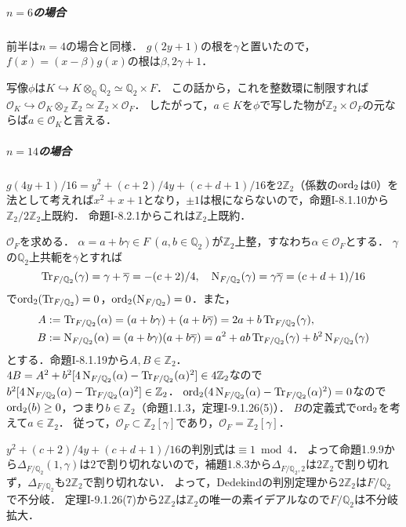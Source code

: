 \subparagraph{$n = 6$の場合}
前半は$n = 4$の場合と同様．
$g(2y+1)$の根を$\gamma$と置いたので，$f(x)=(x-\beta)g(x)$の根は$\beta, 2\gamma+1$．

写像$\phi$は$K\hookrightarrow K\otimes_\mathbb{Q}\mathbb{Q}_2\simeq\mathbb{Q}_2\times F$．
この話から，これを整数環に制限すれば$\mathcal{O}_K\hookrightarrow\mathcal{O}_K\otimes_\mathbb{Z}\mathbb{Z}_2\simeq\mathbb{Z}_2\times\mathcal{O}_F$．
したがって，$a\in K$を$\phi$で写した物が$\mathbb{Z}_2\times\mathcal{O}_F$の元ならば$a\in\mathcal{O}_K$と言える．

\subparagraph{$n = 14$の場合}
$g(4y+1)/16 = y^2+(c+2)/4y+(c+d+1)/16$を$2\mathbb{Z}_2$（係数の$\operatorname{ord}_2$は$0$）を法として考えれば$x^2+x+1$となり，$\pm1$は根にならないので，命題I-8.1.10から$\mathbb{Z}_2/2\mathbb{Z}_2$上既約．
命題I-8.2.1からこれは$\mathbb{Z}_2$上既約．

$\mathcal{O}_F$を求める．
$\alpha=a+b\gamma\in F~ (a, b\in\mathbb{Q}_2)$が$\mathbb{Z}_2$上整，すなわち$\alpha \in \mathcal{O}_F$とする．
$\gamma$の$\mathbb{Q}_2$上共軛を$\overline{\gamma}$とすれば
\[\operatorname{Tr}_{F/\mathbb{Q}_2}(\gamma)=\gamma+\overline{\gamma}=-(c+2)/4, \quad\operatorname{N}_{F/\mathbb{Q}_2}(\gamma)=\gamma\overline{\gamma}=(c+d+1)/16\]
で$\operatorname{ord}_2(\operatorname{Tr}_{F/\mathbb{Q}_2})=0$，$\operatorname{ord}_2(\operatorname{N}_{F/\mathbb{Q}_2})=0$．また，
\begin{align*}
  A &:= \operatorname{Tr}_{F/\mathbb{Q}_2}(\alpha) = (a+b\gamma) + (a+b\overline{\gamma}) = 2a + b\operatorname{Tr}_{F/\mathbb{Q}_2}(\gamma), \\
  B &:= \operatorname{N}_{F/\mathbb{Q}_2}(\alpha) = (a+b\gamma)(a+b\overline{\gamma}) = a^2 + ab\operatorname{Tr}_{F/\mathbb{Q}_2}(\gamma) + b^2\operatorname{N}_{F/\mathbb{Q}_2}(\gamma)
\end{align*}
とする．命題I-8.1.19から$A, B\in\mathbb{Z}_2$．
$4B=A^2+b^2[4\operatorname{N}_{F/\mathbb{Q}_2}(\alpha)-\operatorname{Tr}_{F/\mathbb{Q}_2}(\alpha)^2]\in4\mathbb{Z}_2$なので$b^2[4\operatorname{N}_{F/\mathbb{Q}_2}(\alpha)-\operatorname{Tr}_{F/\mathbb{Q}_2}(\alpha)^2]\in\mathbb{Z}_2$．
$\operatorname{ord}_2(4\operatorname{N}_{F/\mathbb{Q}_2}(\alpha)-\operatorname{Tr}_{F/\mathbb{Q}_2}(\alpha)^2)=0$なので$\operatorname{ord}_2(b)\geq0$，つまり$b\in\mathbb{Z}_2$（命題1.1.3，定理I-9.1.26(5)）．
$B$の定義式で$\operatorname{ord}_2$を考えて$a\in\mathbb{Z}_2$．
従って，$\mathcal{O}_F \subset \mathbb{Z}_2[\gamma]$であり，$\mathcal{O}_F = \mathbb{Z}_2[\gamma]$．

$y^2+(c+2)/4y+(c+d+1)/16$の判別式は$\equiv1\bmod4$．
よって命題1.9.9から$\varDelta_{F/\mathbb{Q}_2}(1, \gamma)$は$2$で割り切れないので，補題1.8.3から$\varDelta_{F/\mathbb{Q}_2, 2}$は$2\mathbb{Z}_2$で割り切れず，$\varDelta_{F/\mathbb{Q}_2}$も$2\mathbb{Z}_2$で割り切れない．
よって，Dedekindの判別定理から$2\mathbb{Z}_2$は$F/\mathbb{Q}_2$で不分岐．
定理I-9.1.26(7)から$2\mathbb{Z}_2$は$\mathbb{Z}_2$の唯一の素イデアルなので$F/\mathbb{Q}_2$は不分岐拡大．

